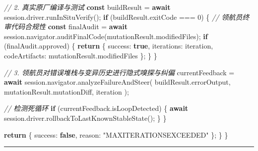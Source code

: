 \documentclass[
]{ctexart}
\newenvironment{Shaded}{}{}
\newcommand{\AttributeTok}[1]{\textcolor[rgb]{0.49,0.56,0.16}{#1}}
\newcommand{\CommentTok}[1]{\textcolor[rgb]{0.38,0.63,0.69}{\textit{#1}}}
\newcommand{\ControlFlowTok}[1]{\textcolor[rgb]{0.00,0.44,0.13}{\textbf{#1}}}
\newcommand{\DecValTok}[1]{\textcolor[rgb]{0.25,0.63,0.44}{#1}}
\newcommand{\FunctionTok}[1]{\textcolor[rgb]{0.02,0.16,0.49}{#1}}
\newcommand{\KeywordTok}[1]{\textcolor[rgb]{0.00,0.44,0.13}{\textbf{#1}}}
\newcommand{\NormalTok}[1]{#1}
\newcommand{\OperatorTok}[1]{\textcolor[rgb]{0.40,0.40,0.40}{#1}}
\newcommand{\StringTok}[1]{\textcolor[rgb]{0.25,0.44,0.63}{#1}}
\renewcommand{\_}{\discretionary{}{}{\textunderscore}}
\begin{document}
\begin{Shaded}
\begin{Highlighting}[]
      \CommentTok{// 2. 真实原厂编译与测试}
      \KeywordTok{const}\NormalTok{ buildResult }\OperatorTok{=} \ControlFlowTok{await}\NormalTok{ session}\OperatorTok{.}\AttributeTok{driver}\OperatorTok{.}\FunctionTok{runInSituVerify}\NormalTok{()}\OperatorTok{;}
      \ControlFlowTok{if}\NormalTok{ (buildResult}\OperatorTok{.}\AttributeTok{exitCode} \OperatorTok{===} \DecValTok{0}\NormalTok{) \{}
        \CommentTok{// 领航员终审代码合规性}
        \KeywordTok{const}\NormalTok{ finalAudit }\OperatorTok{=} \ControlFlowTok{await}\NormalTok{ session}\OperatorTok{.}\AttributeTok{navigator}\OperatorTok{.}\FunctionTok{auditFinalCode}\NormalTok{(mutationResult}\OperatorTok{.}\AttributeTok{modifiedFiles}\NormalTok{)}\OperatorTok{;}
        \ControlFlowTok{if}\NormalTok{ (finalAudit}\OperatorTok{.}\AttributeTok{approved}\NormalTok{) \{}
          \ControlFlowTok{return}\NormalTok{ \{ success}\OperatorTok{:} \KeywordTok{true}\OperatorTok{,}\NormalTok{ iterations}\OperatorTok{:}\NormalTok{ iteration}\OperatorTok{,}\NormalTok{ codeArtifacts}\OperatorTok{:}\NormalTok{ mutationResult}\OperatorTok{.}\AttributeTok{modifiedFiles}\NormalTok{ \}}\OperatorTok{;}
\NormalTok{        \}}
\NormalTok{      \}}

      \CommentTok{// 3. 领航员对错误堆栈与变异历史进行隐式嗅探与纠偏}
\NormalTok{      currentFeedback }\OperatorTok{=} \ControlFlowTok{await}\NormalTok{ session}\OperatorTok{.}\AttributeTok{navigator}\OperatorTok{.}\FunctionTok{analyzeFailureAndSteer}\NormalTok{(}
\NormalTok{        buildResult}\OperatorTok{.}\AttributeTok{errorOutput}\OperatorTok{,}
\NormalTok{        mutationResult}\OperatorTok{.}\AttributeTok{mutationDiff}\OperatorTok{,}
\NormalTok{        iteration}
\NormalTok{      )}\OperatorTok{;}

      \CommentTok{// 检测死循环}
      \ControlFlowTok{if}\NormalTok{ (currentFeedback}\OperatorTok{.}\AttributeTok{isLoopDetected}\NormalTok{) \{}
        \ControlFlowTok{await}\NormalTok{ session}\OperatorTok{.}\AttributeTok{driver}\OperatorTok{.}\FunctionTok{rollbackToLastKnownStableState}\NormalTok{()}\OperatorTok{;}
\NormalTok{      \}}
\NormalTok{    \}}

    \ControlFlowTok{return}\NormalTok{ \{ success}\OperatorTok{:} \KeywordTok{false}\OperatorTok{,}\NormalTok{ reason}\OperatorTok{:} \StringTok{"MAX\_ITERATIONS\_EXCEEDED"}\NormalTok{ \}}\OperatorTok{;}
\NormalTok{  \}}
\NormalTok{\}}
\end{Highlighting}
\end{Shaded}

\begin{center}\rule{0.5\linewidth}{0.5pt}\end{center}
\end{document}
